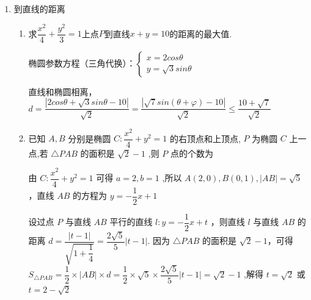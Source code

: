 \begin{enumerate}
\begin{enumerate}
        \item 设椭圆的中心是坐标原点,长轴在 $x$ 轴上,且离心率等于 $\dfrac{\sqrt{3}}{2}$ ,已知点 $P\left( {0,\dfrac{3}{2}}\right)$ 到这个椭圆上的点的最远距离是 $\sqrt{7}$ ,求这个椭圆方程.
        \begin{jieda}
            $\dfrac{c}{a} = \dfrac{\sqrt{3}}{2}$，故$a = 2b$，因此可设椭圆的标准方程为$\dfrac{x^2}{4k}+\dfrac{y^2}{k} = 1$ \\
            因为点 $P\left( {0,\dfrac{3}{2}}\right)$ 到这个椭圆上的点的最远距离是 $\sqrt{7}$，所以$x^2+\left(y-\dfrac{3}{2}\right)^2 \leq 7$恒成立，且等号可以取到，将椭圆的标准方程代入得$4k-4y^2+\left(y-\dfrac{3}{2}\right)^2 \leq 7$，整理得$4k-7 \leq 3y^2+3y-\dfrac{9}{4}$，故$4k-7$就是$3y^2+3y-\dfrac{9}{4}(y \in [-\sqrt{k}, \sqrt{k}])$的最小值.$y = -\dfrac{1}{2}$时$3y^2+3y-\dfrac{9}{4}$取得最小值$-3$，故$k = 1$，经检验满足要求，因此椭圆的标准方程为$\dfrac{x^2}{4}+y^2 = 1$
        \end{jieda}
    \end{enumerate}
    
    \item 到直线的距离
    \begin{enumerate}
        \item 求$\dfrac{x^{2}}{4}+\dfrac{y^{2}}{3} = 1$上点$P$到直线$x+y= 10$的距离的最大值.
        \begin{jieda}
            椭圆参数方程（三角代换）：$\left\{\begin{array}{l}
                 x = 2cos\theta \\
                 y = \sqrt{3}sin\theta
            \end{array}\right.$
            
            直线和椭圆相离，$d = \dfrac{|2cos\theta+\sqrt{3}sin\theta - 10|}{\sqrt{2}} = \dfrac{|\sqrt{7}sin(\theta+\varphi) - 10|}{\sqrt{2}} \leq \dfrac{10+\sqrt{7}}{\sqrt{2}}$
        \end{jieda}

        \item 已知 $A,B$ 分别是椭圆 $C : \dfrac{{x}^{2}}{4} + {y}^{2} = 1$ 的右顶点和上顶点, $P$ 为椭圆 $C$ 上一点,若 $\bigtriangleup  {PAB}$ 的面积是 $\sqrt{2} - 1$ ,则 $P$ 点的个数为
        \begin{jieda}
            由 $C : \dfrac{{x}^{2}}{4} + {y}^{2} = 1$ 可得 $a = 2,b = 1$ ,所以 $A\left( {2,0}\right) ,B\left( {0,1}\right) ,\left| {AB}\right|  = \sqrt{5}$，直线 ${AB}$ 的方程为 $y =  - \dfrac{1}{2}x + 1$

            设过点 $P$ 与直线 ${AB}$ 平行的直线 $l : y =  - \dfrac{1}{2}x + t$ ，则直线 $l$ 与直线 ${AB}$ 的距离 $d = \dfrac{\left| t - 1\right| }{\sqrt{1 + \dfrac{1}{4}}} = \dfrac{2\sqrt{5}}{5}\left| {t - 1}\right|$. 因为 $\bigtriangleup {PAB}$ 的面积是 $\sqrt{2} - 1$，可得 ${S}_{\bigtriangleup {PAB}} = \dfrac{1}{2} \times  \left| {AB}\right|  \times  d = \dfrac{1}{2} \times  \sqrt{5} \times  \dfrac{2\sqrt{5}}{5}\left| {t - 1}\right|  = \sqrt{2} - 1$ ,解得 $t = \sqrt{2}$ 或 $t = 2 - \sqrt{2}$


\end{jieda}
\end{enumerate}
\end{enumerate}
